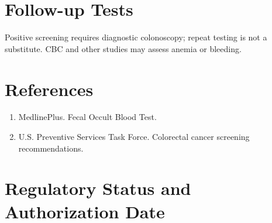 \section*{Follow-up Tests} Positive screening requires diagnostic colonoscopy; repeat testing is not a substitute. CBC and other studies may assess anemia or bleeding.
\section*{References} \begin{enumerate}\item MedlinePlus. Fecal Occult Blood Test.\item U.S. Preventive Services Task Force. Colorectal cancer screening recommendations.\end{enumerate}
\clearpage\section*{Regulatory Status and Authorization Date}\clearpage
